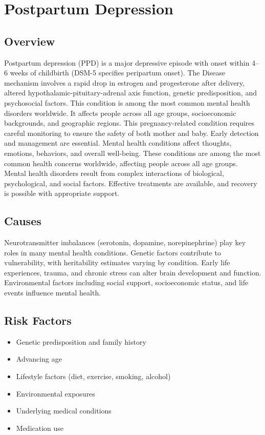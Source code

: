 \chapter{Postpartum Depression}
\label{sec:Postpartum Depression}

\section{Overview}
Postpartum depression (PPD) is a major depressive episode with onset within 4--6 weeks of childbirth (DSM-5 specifies peripartum onset). The Disease mechanism involves a rapid drop in estrogen and progesterone after delivery, altered hypothalamic-pituitary-adrenal axis function, genetic predisposition, and psychosocial factors. This condition is among the most common mental health disorders worldwide. It affects people across all age groups, socioeconomic backgrounds, and geographic regions. This pregnancy-related condition requires careful monitoring to ensure the safety of both mother and baby. Early detection and management are essential. Mental health conditions affect thoughts, emotions, behaviors, and overall well-being. These conditions are among the most common health concerns worldwide, affecting people across all age groups. Mental health disorders result from complex interactions of biological, psychological, and social factors. Effective treatments are available, and recovery is possible with appropriate support.
\section{Causes}
Neurotransmitter imbalances (serotonin, dopamine, norepinephrine) play key roles in many mental health conditions. Genetic factors contribute to vulnerability, with heritability estimates varying by condition. Early life experiences, trauma, and chronic stress can alter brain development and function. Environmental factors including social support, socioeconomic status, and life events influence mental health.   
\section{Risk Factors}
\begin{itemize}[noitemsep]
  \item Genetic predisposition and family history
  \item Advancing age
  \item Lifestyle factors (diet, exercise, smoking, alcohol)
  \item Environmental exposures
  \item Underlying medical conditions
  \item Medication use
\end{itemize}
